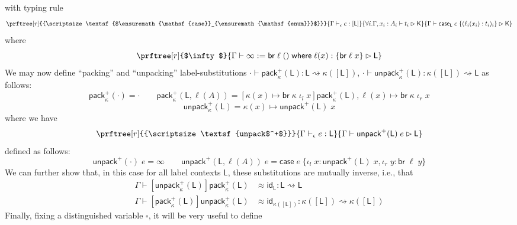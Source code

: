 \documentclass[acmsmall,screen,review]{acmart}
\newcommand{\ms}[1]{\ensuremath{\mathsf{#1}}}
\newcommand{\lto}{:}
\newcommand{\linl}[1]{\iota_l\;{#1}}
\newcommand{\linr}[1]{\iota_r\;{#1}}
\newcommand{\brb}[2]{\ms{br}\;#1\;#2}
\newcommand{\casestmt}[5]{\ms{case}\;#1\;\{\linl{#2} \lto #3, \linr{#4} \lto #5\}}
\newcommand{\where}[2]{#1\;\ms{where}\;#2}
\newcommand{\wbranch}[3]{#1(#2) \lto \{#3\}}
\newcommand{\bhyp}[2]{#1 : #2}
\newcommand{\rle}[1]{{\scriptsize\textsf{#1}}}
\newcommand{\hasty}[4]{#1 \vdash_{#2} #3: {#4}}
\newcommand{\haslb}[3]{#1 \vdash #2 \rhd #3}
\newcommand{\lbsubst}[4]{#1 \vdash #2: #3 \rightsquigarrow #4}
\newcommand{\teqv}{\approx}
\newcommand{\invar}{\square}
\begin{document}
with typing rule
\begin{equation}
  \prftree[r]{\rle{$\ms{case}_{\ms{enum}}$}}
    {\hasty{\Gamma}{\epsilon}{e}{[\ms{L}]}}
    {\forall i. \haslb{\Gamma, \bhyp{x_i}{A_i}}{t_i}{\ms{K}}}
    {\haslb{\Gamma}{\ms{case}_{\ms{L}}\;e\;\{(\ell_i(x_i): t_i)_i\}}{\ms{K}}}
\end{equation}
where
\begin{equation}
  \prftree[r]{$\infty$}
    {\haslb{\Gamma}{\infty := \where{\brb{\ell}{()}}{\wbranch{\ell}{x}{\brb{\ell}{x}}}}{\ms{L}}}
\end{equation}
We may now define ``packing'' and ``unpacking'' label-substitutions
$\lbsubst{\cdot}{\ms{pack}_\kappa^+(\ms{L})}{\ms{L}}{\kappa([\ms{L}])}$,
$\lbsubst{\cdot}{\ms{unpack}_\kappa^+(\ms{L})}{\kappa([\ms{L}])}{\ms{L}}$ as follows:
\begin{equation}
  \ms{pack}_\kappa^+(\cdot) = \cdot \qquad
  \ms{pack}_\kappa^+(\ms{L}, \ell(A)) 
  = [\kappa(x) \mapsto \brb{\kappa}{\iota_l\;x}]\ms{pack}_\kappa^+(\ms{L}), 
    \ell(x) \mapsto \brb{\kappa}{\iota_r\;x}  
\end{equation}
\begin{equation}
  \ms{unpack}_\kappa^+(\ms{L}) = \kappa(x) \mapsto \ms{unpack}^+(\ms{L})\;x
\end{equation}
where we have
\begin{equation}
  \prftree[r]{\rle{unpack$^+$}}
    {\hasty{\Gamma}{\epsilon}{e}{\ms{L}}}
    {\haslb{\Gamma}{\ms{unpack}^+(\ms{L})\;e}{\ms{L}}}
\end{equation}
defined as follows:
\begin{equation}
  \ms{unpack}^+(\cdot)\;e = \infty \qquad
  \ms{unpack}^+(\ms{L}, \ell(A))\;e = \casestmt{e}{x}{\ms{unpack}^+(\ms{L})\;x}{y}{\brb{\ell}{y}}
\end{equation}
We can further show that, in this case for all label contexts $\ms{L}$, these substitutions are
mutually inverse, i.e., that
\begin{equation}
  \begin{aligned}
  \lbsubst{\Gamma}
    {[\ms{unpack}_\kappa^+(\ms{L})]\ms{pack}_\kappa^+(\ms{L}) 
      &\teqv \ms{id}_{\ms{L}}}{\ms{L}}{\ms{L}}
  \\
  \lbsubst{\Gamma}
    {[\ms{pack}_\kappa^+(\ms{L})]\ms{unpack}_\kappa^+(\ms{L}) &\teqv \ms{id}_{\kappa([\ms{L}])}}
    {\kappa([\ms{L}])}{\kappa([\ms{L}])}
  \end{aligned}
\end{equation}
Finally, fixing a distinguished variable $\invar$, it will be very useful to define 
\end{document}
